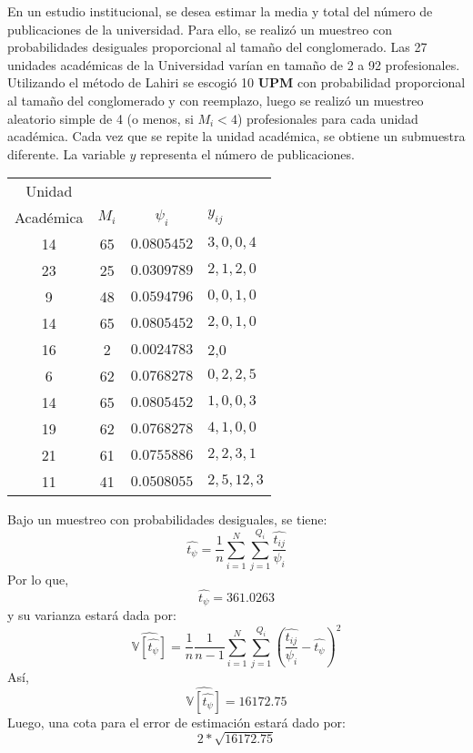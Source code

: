 
\addpoints
\question[20] En un estudio institucional, se desea estimar la media y total del número de publicaciones de la universidad. Para ello, se realizó un muestreo con probabilidades desiguales proporcional al tamaño del conglomerado. Las 27 unidades académicas de la Universidad varían en tamaño de 2 a 92 profesionales. Utilizando el método de Lahiri se escogió 10 \textbf{UPM} con probabilidad proporcional al tamaño del conglomerado y con reemplazo, luego se realizó un muestreo aleatorio simple de 4 (o menos, si $M_i<4$) profesionales para cada unidad académica. Cada vez que se repite la unidad académica, se obtiene un submuestra diferente. La variable $y$ representa el número de publicaciones.

\begin{center}
\begin{tabular}{cccl} 
Unidad & & & \\
Académica & $M_{i}$ & $\psi_{i}$ & $y_{i j}$ \\
\hline 14 & 65 & $0.0805452$ & $3,0,0,4$ \\
23 & 25 & $0.0309789$ & $2,1,2,0$ \\
9 & 48 & $0.0594796$ & $0,0,1,0$ \\
14 & 65 & $0.0805452$ & $2,0,1,0$ \\
16 & 2 & $0.0024783$ & 2,0 \\
6 & 62 & $0.0768278$ & $0,2,2,5$ \\
14 & 65 & $0.0805452$ & $1,0,0,3$ \\
19 & 62 & $0.0768278$ & $4,1,0,0$ \\
21 & 61 & $0.0755886$ & $2,2,3,1$ \\
11 & 41 & $0.0508055$ & $2,5,12,3$
\end{tabular}
\end{center}
\noaddpoints
{}
\begin{solution}
Bajo un muestreo con probabilidades desiguales, se tiene:
$$\widehat{t_\psi}=\dfrac{1}{n}\sum_{i=1}^{N} \sum_{j=1}^{Q_i} \dfrac{\widehat{t_{ij}}}{\psi_i}$$
Por lo que,
$$\widehat{t_\psi}=361.0263$$
y su varianza estará dada por:
$$\widehat{\mathbb{V}[\widehat{t_\psi}]}= \dfrac{1}{n} \dfrac{1}{n-1} \sum_{i=1}^{N}  \sum_{j=1}^{Q_i} \left( \dfrac{\widehat{t_{ij}}}{\psi_i}-\widehat{t_\psi}\right)^2$$
Así,
$$\widehat{\mathbb{V}[\widehat{t_\psi}]}=16172.75$$
Luego, una cota para el error de estimación estará dado por:
$$2*\sqrt{16172.75}$$
\end{solution}